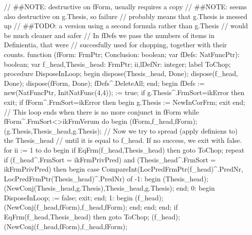 // ##NOTE: destructive on fForm, usually requires a copy
// ##NOTE: seems also destructive on g.Thesis, so failure
//         probably means that g.Thesis is messed up
// ##TODO: a version using a second formula rather than g.Thesis
//         would be much cleaner and safer
// In fDefs we pass the numbers of items in Definientia, that were
// succesfully used for chopping, together with their counts.
function (fForm: FrmPtr;
                 Conclusion: boolean;
                 var fDefs: NatFuncPtr): boolean;
var
   f_head,Thesis_head: FrmPtr;
   ii,lDefNr: integer;
label ToChop;
procedure DisposeInLoop;
begin
   dispose(Thesis_head, Done);
   dispose(f_head, Done);
   dispose(fForm, Done);
   fDefs^.DeleteAll;
end;
begin
   fDefs :=  new(NatFuncPtr, InitNatFunc(4,4));
    := true; if g.Thesis^.FrmSort=ikError then exit;
   if fForm^.FrmSort=ikError then begin g.Thesis := NewInCorFrm; exit end;
   // This loop ends when there is no more conjunct in fForm
   while fForm^.FrmSort<>ikFrmVerum do
   begin
      (fForm,f_head,fForm);
      (g.Thesis,Thesis_head,g.Thesis);
      // Now we try to spread (apply definiens to) the Thesis_head
      // until it is equal to f_head. If no success, we exit with false.
      for ii := 1 to  do
      begin
         if EqFrm(f_head,Thesis_head) then goto ToChop;
         repeat
            if (f_head^.FrmSort = ikFrmPrivPred) and (Thesis_head^.FrmSort = ikFrmPrivPred) then
            begin
               case CompareInt(LocPredFrmPtr(f_head)^.PredNr, LocPredFrmPtr(Thesis_head)^.PredNr) of
                  -1:
                     begin
                        (Thesis_head);
                        (NewConj(Thesis_head,g.Thesis),Thesis_head,g.Thesis);
                     end;
                  0: begin DisposeInLoop;  := false; exit; end;
                  1:
                     begin
                        (f_head);
                        (NewConj(f_head,fForm),f_head,fForm);
                     end;
               end;
            end;
            if EqFrm(f_head,Thesis_head) then goto ToChop;
            (f_head);
            (NewConj(f_head,fForm),f_head,fForm);
